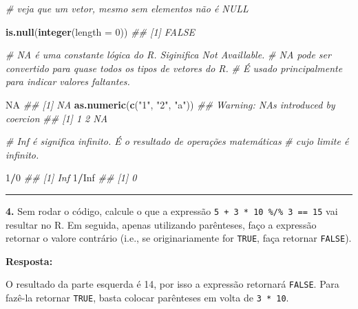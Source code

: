\documentclass[]{book}
\newenvironment{Shaded}{\begin{snugshade}}{\end{snugshade}}
\newcommand{\CommentTok}[1]{\textcolor[rgb]{0.56,0.35,0.01}{\textit{#1}}}
\newcommand{\DataTypeTok}[1]{\textcolor[rgb]{0.13,0.29,0.53}{#1}}
\newcommand{\DecValTok}[1]{\textcolor[rgb]{0.00,0.00,0.81}{#1}}
\newcommand{\KeywordTok}[1]{\textcolor[rgb]{0.13,0.29,0.53}{\textbf{#1}}}
\newcommand{\NormalTok}[1]{#1}
\newcommand{\OperatorTok}[1]{\textcolor[rgb]{0.81,0.36,0.00}{\textbf{#1}}}
\newcommand{\OtherTok}[1]{\textcolor[rgb]{0.56,0.35,0.01}{#1}}
\newcommand{\StringTok}[1]{\textcolor[rgb]{0.31,0.60,0.02}{#1}}
\begin{document}
\begin{Shaded}
\begin{Highlighting}[]
\CommentTok{# veja que um vetor, mesmo sem elementos não é NULL}

\KeywordTok{is.null}\NormalTok{(}\KeywordTok{integer}\NormalTok{(}\DataTypeTok{length =} \DecValTok{0}\NormalTok{)) }
\CommentTok{## [1] FALSE}

\CommentTok{# NA é uma constante lógica do R. Siginifica Not Availlable. }
\CommentTok{# NA pode ser convertido para quase todos os tipos de vetores do R. }
\CommentTok{# É usado principalmente para indicar valores faltantes.}

\OtherTok{NA}
\CommentTok{## [1] NA}
\KeywordTok{as.numeric}\NormalTok{(}\KeywordTok{c}\NormalTok{(}\StringTok{"1"}\NormalTok{, }\StringTok{"2"}\NormalTok{, }\StringTok{"a"}\NormalTok{))}
\CommentTok{## Warning: NAs introduced by coercion}
\CommentTok{## [1]  1  2 NA}

\CommentTok{# Inf é significa infinito. É o resultado de operações matemáticas }
\CommentTok{# cujo limite é infinito.}

\DecValTok{1}\OperatorTok{/}\DecValTok{0}
\CommentTok{## [1] Inf}
\DecValTok{1}\OperatorTok{/}\OtherTok{Inf}
\CommentTok{## [1] 0}
\end{Highlighting}
\end{Shaded}

\begin{center}\rule{0.5\linewidth}{\linethickness}\end{center}

\textbf{4.} Sem rodar o código, calcule o que a expressão \texttt{5\ +\ 3\ *\ 10\ \%/\%\ 3\ ==\ 15} vai resultar no R. Em seguida, apenas utilizando parênteses, faço a expressão retornar o valore contrário (i.e., se originariamente for \texttt{TRUE}, faça retornar \texttt{FALSE}).

\textbf{Resposta:}

O resultado da parte esquerda é 14, por isso a expressão retornará \texttt{FALSE}. Para fazê-la retornar \texttt{TRUE}, basta colocar parênteses em volta de \texttt{3\ *\ 10}.

\begin{Shaded}
\end{Shaded}
\end{document}
